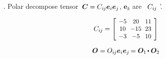 \begin{tcolorbox}
\small\setlength{\abovedisplayskip}{2pt}\setlength{\belowdisplayskip}{2pt}

.
Polar decompose tensor~${\bm{C} = C_{i\hspace{-0.1ex}j} \bm{e}_i \bm{e}_j}$,
$\bm{e}_k$ are
~$C_{i\hspace{-0.1ex}j}$
 \tensor’.

\begin{equation*}
C_{i\hspace{-0.1ex}j} =
\scalebox{0.92}[0.92]{$\left[\hspace{-0.2ex}\begin{array}{c@{\hspace{.6em}}c@{\hspace{.6em}}c}
-5 & 20 & 11 \\
10 & -15 & 23 \\
-3 & -5 & 10
\end{array}\hspace{-0.2ex}\right]$}
\end{equation*}

\begin{equation*}
\rotationtensor = O_{i\hspace{-0.1ex}j} \bm{e}_i \bm{e}_j \hspace{-0.2ex}
= \bm{O}_1 \hspace{-0.2ex} \dotp \bm{O}_2
\end{equation*}


\end{tcolorbox}
